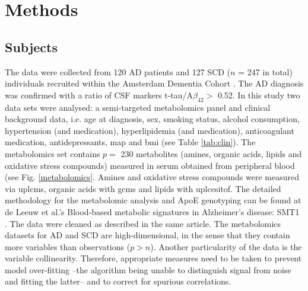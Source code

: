 \documentclass{amsart}
\begin{document}
\newpage
\section{Methods}\label{methods}

\subsection{Subjects}\label{subjects}
The data were collected from 120 AD patients and 127 SCD ($n$ = 247 in total) individuals recruited within the Amsterdam Dementia Cohort \cite{VanDerFlier2018AmsterdamCare, deLeeuw2017Blood-basedDisease}. The AD diagnosis was confirmed with a ratio of CSF markers t-tau/A$\beta_{42}>$ 0.52.  In this study two data sets were analysed: a semi-targeted metabolomics panel and clinical background data, i.e. age at diagnosis, sex, smoking status, alcohol consumption, hypertension (and medication), hyperlipidemia (and medication), anticoagulant medication, antidepressants, \acrfull{map} and \acrfull{bmi} (see Table \ref{tab:clin}). The metabolomics set contains $p =$ 230 metabolites (amines, organic acids, lipids and oxidative stress compounds) measured in serum obtained from peripheral blood (see Fig. \ref{metabolomics}. Amines and oxidative stress compounds were measured via \acrfull{uplcms}, organic acids with \acrfull{gcms} and lipids with \acrfull{uplcesitof}. The detailed methodology for the metabolomic analysis and ApoE genotyping can be found at de Leeuw et al.'s  Blood-based metabolic signatures in Alzheimer's disease: SMT1 \cite{deLeeuw2017Blood-basedDisease}. The data were cleaned as described in the same article. The metabolomics datasets for AD and SCD are high-dimensional, in the sense that they contain more variables than observations ($p > n$). Another particularity of the data is the variable collinearity. Therefore, appropriate measures need to be taken to prevent model over-fitting --the algorithm being unable to distinguish signal from noise and fitting the latter--  and to correct for spurious correlations.
\end{document}

